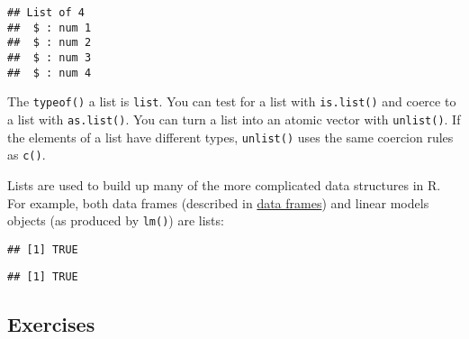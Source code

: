 \begin{verbatim}
## List of 4
##  $ : num 1
##  $ : num 2
##  $ : num 3
##  $ : num 4
\end{verbatim}

The \texttt{typeof()} a list is \texttt{list}. You can test for a list
with \texttt{is.list()} and coerce to a list with \texttt{as.list()}.
You can turn a list into an atomic vector with \texttt{unlist()}. If the
elements of a list have different types, \texttt{unlist()} uses the same
coercion rules as \texttt{c()}.

Lists are used to build up many of the more complicated data structures
in R. For example, both data frames (described in
\protect\hyperlink{data-frames}{data frames}) and linear models objects
(as produced by \texttt{lm()}) are lists:

\begin{Shaded}
\begin{Highlighting}[]
\end{Highlighting}
\end{Shaded}

\begin{verbatim}
## [1] TRUE
\end{verbatim}

\begin{Shaded}
\begin{Highlighting}[]
\StringTok{ }\OperatorTok{~}\StringTok{ }
\end{Highlighting}
\end{Shaded}

\begin{verbatim}
## [1] TRUE
\end{verbatim}

\hypertarget{exercises}{%
\subsection{Exercises}\label{exercises}}

